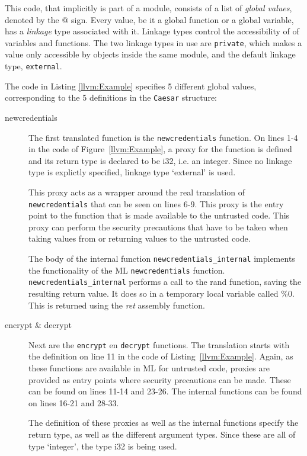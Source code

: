 \documentclass[10pt,a4paper]{report}
\begin{document}
This code, that implicitly is part of a module, consists of a list of \emph{global values}, denoted by the @ sign.
Every value, be it a global function or a global variable, has a \emph{linkage} type associated with it.
Linkage types control the accessibility of of variables and functions. The two linkage types in use are \texttt{private}, which makes a value only accessible by objects inside the same module, and the default linkage type, \texttt{external}.

The code in Listing \ref{llvm:Example} specifies 5 different global values, corresponding to the 5 definitions in the \texttt{Caesar} structure:
\begin{description}
\item[newcredentials] The first translated function is the \texttt{newcredentials} function.
On lines 1-4 in the code of Figure~\ref{llvm:Example}, a proxy for the function is defined and its return type is declared to be i32, i.e. an integer. Since no linkage type is explictly specified, linkage type `external'  is used.

This proxy acts as a wrapper around the real translation of \texttt{newcredentials} that can be seen on lines 6-9. This proxy is the entry point to the function that is made available to the untrusted code. This proxy can perform the security precautions that have to be taken when taking values from or returning values to the untrusted code.

The body of the internal function \texttt{newcredentials\_internal} implements the functionality of the ML \texttt{newcredentials} function.
\texttt{newcredentials\_internal} performs a call to the rand function, saving the resulting return value. It does so in a temporary local variable called \%0. This is returned using the \emph{ret} assembly function.

\item[encrypt \& decrypt] Next are the \texttt{encrypt} en \texttt{decrypt} functions. The translation starts with the definition on line 11 in the code of Listing~\ref{llvm:Example}. Again, as these functions are available in ML for untrusted code, proxies are provided as entry points where security precautions can be made. These can be found on lines 11-14 and 23-26. The internal functions can be found on lines 16-21 and 28-33.

The definition of these proxies as well as the internal functions specify the return type, as well as the different argument types. Since these are all of type `integer', the type i32 is being used.


\end{description}
\end{document}
